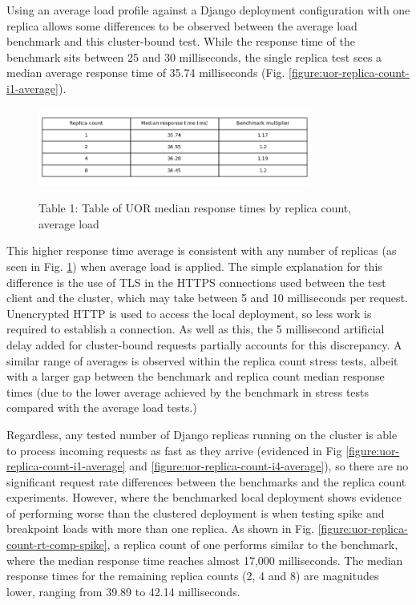 \begin{figure}[h]
    
\end{figure}

Using an average load profile against a Django deployment configuration with one replica allows some differences to be observed between the average load benchmark and this cluster-bound test. While the response time of the benchmark sits between 25 and 30 milliseconds, the single replica test sees a median average response time of 35.74 milliseconds (Fig. \ref{figure:uor-replica-count-i1-average}).

\begin{figure}[h]
    \captionsetup{labelformat=empty}
    \caption{Table 1: Table of UOR median response times by replica count, average load}
    \centering
    \includegraphics[width=0.8\textwidth]{figures/uor-replica-count-rt-comparison.png}
    \label{figure:uor-replica-count-rt-comparison}
\end{figure}

This higher response time average is consistent with any number of replicas (as seen in Fig. \ref{figure:uor-replica-count-rt-comparison}) when average load is applied. The simple explanation for this difference is the use of TLS in the HTTPS connections used between the test client and the cluster, which may take between 5 and 10 milliseconds per request. Unencrypted HTTP is used to access the local deployment, so less work is required to establish a connection. As well as this, the 5 millisecond artificial delay added for cluster-bound requests partially accounts for this discrepancy. A similar range of averages is observed within the replica count stress tests, albeit with a larger gap between the benchmark and replica count median response times (due to the lower average achieved by the benchmark in stress tests compared with the average load tests.)

Regardless, any tested number of Django replicas running on the cluster is able to process incoming requests as fast as they arrive (evidenced in Fig \ref{figure:uor-replica-count-i1-average} and \ref{figure:uor-replica-count-i4-average}), so there are no significant request rate differences between the benchmarks and the replica count experiments. However, where the benchmarked local deployment shows evidence of performing worse than the clustered deployment is when testing spike and breakpoint loads with more than one replica. As shown in Fig. \ref{figure:uor-replica-count-rt-comp-spike}, a replica count of one performs similar to the benchmark, where the median response time reaches almost 17,000 milliseconds. The median response times for the remaining replica counts (2, 4 and 8) are magnitudes lower, ranging from 39.89 to 42.14 milliseconds.

